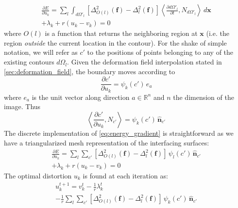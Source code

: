 \begin{multline}
\frac{\partial E}{\partial u_k} = \sum\limits_l \int_{d\Omega'_l} \left[ \Delta^2_{O(l)} (\mathbf{f}) - \Delta^2_l (\mathbf{f}) \right]
\left\langle\frac{\partial{d\Omega'_l}}{\partial t}, N_{d\Omega'_l}\right\rangle \,d\mathbf{x} \\
+ \lambda_k + r(u_k - v_k) = 0
\label{eq:energy_gradient}
\end{multline}
where $O(l)$ is a function that returns the neighboring region at $\mathbf{x}$ (i.e.
the region \emph{outside} the current location in the contour). For the shake of
simple notation, we will refer as $c'$ to the positions of points belonging to
any of the existing contours $d\Omega_l$.
Given the deformation field interpolation stated in \autoref{sec:deformation_field}, 
the boundary moves according to
\begin{equation}
\frac{\partial c'}{\partial u_k} = \psi_k(c')\,e_a
\end{equation}
where $e_a$ is the unit vector along direction $a \in \mathbb{R}^n$ and $n$ the dimension
of the image. Thus
\begin{equation}
\left\langle\frac{\partial c'}{\partial u_k}, N_{c'}\right\rangle = \psi_k(c')\,\hat{\mathbf{n}}_{c'}
\end{equation}
The discrete implementation of \eqref{eq:energy_gradient} is straightforward as
we have a triangularized mesh representation of the interfacing surfaces:
\begin{multline}
\frac{\partial E}{\partial u_k} = \sum\limits_l \sum\limits_{c'} \left[ \Delta^2_{O(l)} (\mathbf{f}) - \Delta^2_l (\mathbf{f}) \right]
\, \psi_l(c')\,\hat{\mathbf{n}}_{c'} \\
+ \lambda_k + r(u_k - v_k) = 0
\label{eq:discrete_energy_gradient}
\end{multline}
The optimal distortion $u_k$ is found at each iteration as:
\begin{multline}
u_k^{t+1} = v_k^t - \frac{1}{r}\lambda_k^{t} \\
- \frac{1}{r} \sum\limits_l \sum\limits_{c'} \left[ \Delta^2_{O(l)} (\mathbf{f}) - \Delta^2_l (\mathbf{f}) \right]
\, \psi_k(c')\,\hat{\mathbf{n}}_{c'}
\label{eq:update_u}
\end{multline}


